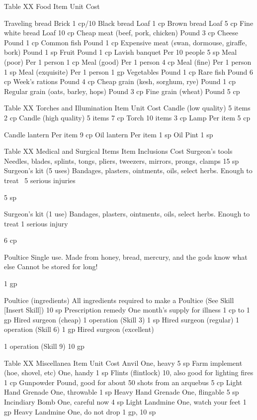 \documentclass[oneside,11pt,english]{book}
\begin{document}
 
Table XX Food 
Item Unit Cost 


Traveling bread Brick 1 cp/10 
Black bread Loaf 1 cp 
Brown bread Loaf 5 cp 
Fine white bread Loaf 10 cp 
Cheap meat (beef, pork, chicken) Pound 3 cp 
Cheese Pound 1 cp 
Common fish Pound 1 cp 
Expensive meat (swan, dormouse, giraffe, bork) Pound 1 sp 
Fruit Pound 1 cp 
Lavish banquet Per 10 people 5 sp 
Meal (poor) Per 1 person 1 cp 
Meal (good) Per 1 person 4 cp 
Meal (fine) Per 1 person 1 sp 
Meal (exquisite) Per 1 person 1 gp 
Vegetables Pound 1 cp 
Rare fish Pound 6 cp 
Week's rations Pound 4 cp 
Cheap grain (kesh, sorghum, rye) Pound 1 cp 
Regular grain (oats, barley, hops) Pound 3 cp 
Fine grain (wheat) Pound 5 cp 

 
Table XX Torches and Illumination 
Item Unit Cost 
Candle (low quality) 5 items 2 cp 
Candle (high quality) 5 items 7 cp 
Torch 10 items 3 cp 
Lamp Per item 5 cp 


Candle lantern Per item 9 cp 
Oil lantern Per item 1 sp 
Oil Pint 1 sp 

 
Table XX Medical and Surgical Items 
Item Inclusions Cost 
Surgeon’s tools Needles, blades, splints, tongs, pliers, tweezers, mirrors, prongs, clamps 15 sp 
Surgeon’s kit (5 uses) Bandages, plasters, ointments, oils, select herbs. Enough to treat ~5 serious 
injuries 

5 sp 

Surgeon’s kit (1 use) Bandages, plasters, ointments, oils, select herbs. Enough to treat 1 serious 
injury 

6 cp 

Poultice Single use. Made from honey, bread, mercury, and the gods know what else 
Cannot be stored for long! 

1 gp 

Poultice (ingredients) All ingredients required to make a Poultice (See Skill [Insert Skill]) 10 sp 
Prescription remedy One month’s supply for illness 1 cp to 1 
gp 
Hired surgeon (cheap) 1 operation (Skill 3) 1 sp 
Hired surgeon (regular) 1 operation (Skill 6) 1 gp 
Hired surgeon 
(excellent) 

1 operation (Skill 9) 10 gp 

 
Table XX Miscellanea 
Item Unit Cost 
Anvil One, heavy 5 sp 
Farm implement (hoe, shovel, etc) One, handy 1 sp 
Flints (flintlock) 10, also good for lighting fires 1 cp 
Gunpowder Pound, good for about 50 shots from an arquebus 5 cp 
Light Hand Grenade One, throwable 1 sp 
Heavy Hand Grenade One, flingable 5 sp 
Incindiary Bomb One, careful now 4 sp 
Light Landmine One, watch your feet 1 gp 
Heavy Landmine One, do not drop 1 gp, 10 sp 
\end{document}
